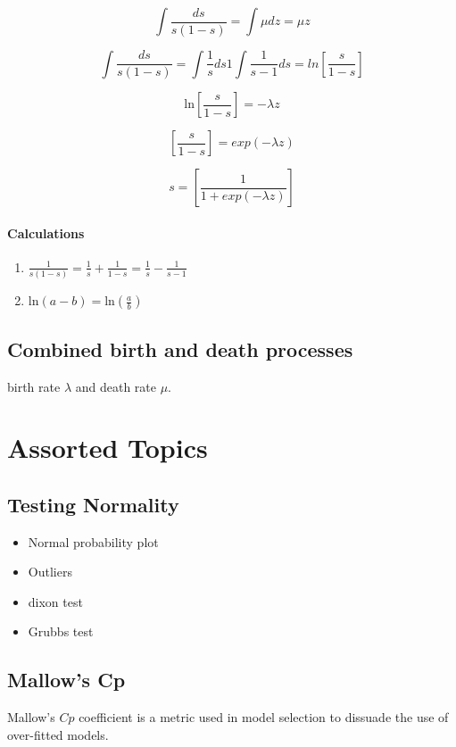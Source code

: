\[ \int \frac{ds}{s(1-s)} = \int \mu dz = \mu z \]


\[ \int \frac{ds}{s(1-s)} = \int \frac{1}{s} ds 1 \int
\frac{1}{s-1}ds= ln \left[\frac{s}{1-s} \right]
\]

\[  \mbox{ln} \left[\frac{s}{1-s} \right] = -\lambda z
\]

\[  \left[\frac{s}{1-s} \right] = exp(-\lambda z)
\]

\[  s = \left[\frac{1}{1+exp(-\lambda z)} \right]
\]

\subsubsection{Calculations}
\begin{enumerate} \item  $ \frac{1}{s(1-s)} = \frac{1}{s} + \frac{1}{1-s} =
	\frac{1}{s} - \frac{1}{s-1}$
	\item $ \mbox{ln}(a-b) = \mbox{ln}(\frac{a}{b})$\\
\end{enumerate}

\section{Combined birth and death processes}
birth rate $\lambda$ and death rate $\mu$.


\newpage
\chapter{Assorted Topics}

\section{Testing Normality}

\begin{itemize}
	\item Normal probability plot \item Outliers \item dixon test
	\item Grubbs test
\end{itemize}


\section{Mallow's Cp}
Mallow's $Cp$ coefficient is a metric used in model selection to
dissuade the use of over-fitted models.

